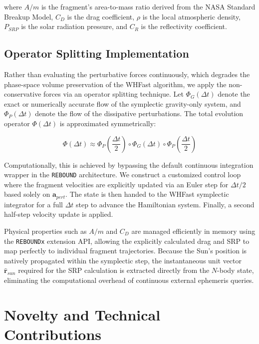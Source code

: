 \documentclass[letterpaper, paper,11pt]{AAS}
\begin{document}
where $A/m$ is the fragment's area-to-mass ratio derived from the NASA Standard Breakup Model, $C_D$ is the drag coefficient, $\rho$ is the local atmospheric density, $P_{SRP}$ is the solar radiation pressure, and $C_R$ is the reflectivity coefficient.

\subsection{Operator Splitting Implementation}
Rather than evaluating the perturbative forces continuously, which degrades the phase-space volume preservation of the WHFast algorithm, we apply the non-conservative forces via an operator splitting technique. Let $\Phi_G(\Delta t)$ denote the exact or numerically accurate flow of the symplectic gravity-only system, and $\Phi_P(\Delta t)$ denote the flow of the dissipative perturbations. The total evolution operator $\Phi(\Delta t)$ is approximated symmetrically:

\begin{equation}
    \Phi(\Delta t) \approx \Phi_P\left(\frac{\Delta t}{2}\right) \circ \Phi_G(\Delta t) \circ \Phi_P\left(\frac{\Delta t}{2}\right)
\end{equation}

Computationally, this is achieved by bypassing the default continuous integration wrapper in the \texttt{REBOUND} architecture. We construct a customized control loop where the fragment velocities are explicitly updated via an Euler step for $\Delta t / 2$ based solely on $\mathbf{a}_{pert}$. The state is then handed to the WHFast symplectic integrator for a full $\Delta t$ step to advance the Hamiltonian system. Finally, a second half-step velocity update is applied. 

Physical properties such as $A/m$ and $C_D$ are managed efficiently in memory using the \texttt{REBOUNDx} extension API, allowing the explicitly calculated drag and SRP to map perfectly to individual fragment trajectories. Because the Sun's position is natively propagated within the symplectic step, the instantaneous unit vector $\mathbf{\hat{r}}_{sun}$ required for the SRP calculation is extracted directly from the $N$-body state, eliminating the computational overhead of continuous external ephemeris queries.

\section*{Novelty and Technical Contributions}
\end{document}

